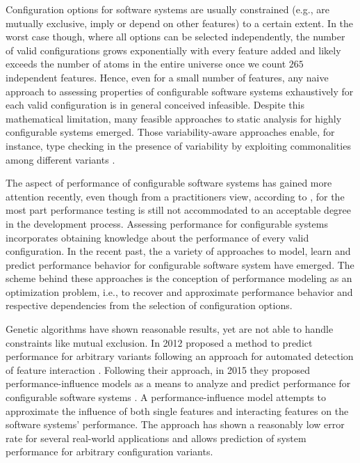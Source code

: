 Configuration options for software systems are usually constrained (e.g., are
mutually exclusive, imply or depend on other features) to a certain extent. In
the worst case though, where all options can be selected independently, the
number of valid configurations grows exponentially with every feature added and
likely exceeds the number of atoms in the entire universe once we count $265$
independent features. Hence, even for a small number of features, any naive
approach to assessing properties of configurable software systems exhaustively
for each valid configuration is in general conceived infeasible. Despite this
mathematical limitation, many feasible approaches to static analysis for highly
configurable systems emerged. Those variability-aware approaches enable, for
instance, type checking in the presence of variability by
exploiting commonalities among different variants \citep{thum_classification_2014}.

The aspect of performance of configurable software systems has gained more
attention recently, even though from a practitioners view, according to
\cite{molyneaux_art_2014}, for the most part performance testing is still not
accommodated to an acceptable degree in the development process.
Assessing performance for configurable systems incorporates obtaining knowledge about the performance of
every valid configuration. In the recent past, the a variety of approaches to
model, learn and predict performance behavior for configurable software system
have emerged. The scheme behind these approaches is the conception of
performance modeling as an optimization problem, i.e., to recover and
approximate performance behavior and respective dependencies from the selection
of configuration options.

Genetic algorithms \citep{guo_genetic_2011,sayyad_scalable_2013}  have shown
reasonable results, yet are not able to handle constraints like mutual
exclusion. In 2012 \citeauthor{siegmund_predicting_2012} proposed a
method to predict performance for arbitrary variants following an approach for
automated detection of feature interaction \citep{siegmund_predicting_2012}.
Following their approach, in 2015 they proposed performance-influence models as a means
to analyze and predict performance for configurable software systems
\citep{siegmund_performance-influence_2015}. A performance-influence model
attempts to approximate the influence of both single features and interacting
features on the software systems' performance.
The approach has shown a reasonably low error rate for several real-world
applications and allows prediction of system performance for arbitrary
configuration variants.

